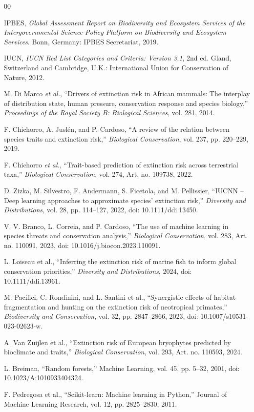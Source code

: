 \documentclass[conference]{IEEEtran}
\begin{document}


\begin{thebibliography}{00}

IPBES, \textit{Global Assessment Report on Biodiversity and Ecosystem Services of the Intergovernmental Science-Policy Platform on Biodiversity and Ecosystem Services}. Bonn, Germany: IPBES Secretariat, 2019.

IUCN, \textit{IUCN Red List Categories and Criteria: Version 3.1}, 2nd ed. Gland, Switzerland and Cambridge, U.K.: International Union for Conservation of Nature, 2012.

M. Di Marco \textit{et al.}, ``Drivers of extinction risk in African mammals: The interplay of distribution state, human pressure, conservation response and species biology,'' \textit{Proceedings of the Royal Society B: Biological Sciences}, vol. 281, 2014.

F. Chichorro, A. Juslén, and P. Cardoso, ``A review of the relation between species traits and extinction risk,'' \textit{Biological Conservation}, vol. 237, pp. 220--229, 2019.

F. Chichorro \textit{et al.}, ``Trait-based prediction of extinction risk across terrestrial taxa,'' \textit{Biological Conservation}, vol. 274, Art. no. 109738, 2022.

 D. Zizka, M. Silvestro, F. Andermann, S. Ficetola, and M. Pellissier, ``IUCNN -- Deep learning approaches to approximate species' extinction risk,'' \textit{Diversity and Distributions}, vol. 28, pp. 114--127, 2022, doi: 10.1111/ddi.13450.

 V. V. Branco, L. Correia, and P. Cardoso, ``The use of machine learning in species threats and conservation analysis,'' \textit{Biological Conservation}, vol. 283, Art. no. 110091, 2023, doi: 10.1016/j.biocon.2023.110091.

 L. Loiseau et al., ``Inferring the extinction risk of marine fish to inform global conservation priorities,'' \textit{Diversity and Distributions}, 2024, doi: 10.1111/ddi.13961.

 M. Pacifici, C. Rondinini, and L. Santini et al., ``Synergistic effects of habitat fragmentation and hunting on the extinction risk of neotropical primates,'' \textit{Biodiversity and Conservation}, vol. 32, pp. 2847--2866, 2023, doi: 10.1007/s10531-023-02623-w.

 A. Van Zuijlen et al., ``Extinction risk of European bryophytes predicted by bioclimate and traits,'' \textit{Biological Conservation}, vol. 293, Art. no. 110593, 2024.

L. Breiman, ``Random forests,''
Machine Learning, vol. 45, pp. 5--32, 2001,
doi: 10.1023/A:1010933404324.

F. Pedregosa et al., ``Scikit-learn: Machine learning in Python,''
Journal of Machine Learning Research, vol. 12, pp. 2825--2830, 2011.

\end{thebibliography}
\end{document}
